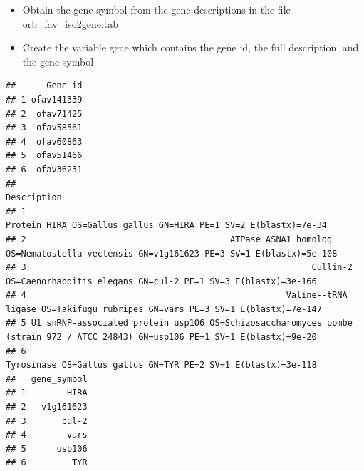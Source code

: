 \documentclass[
]{article}
\newenvironment{Shaded}{\begin{snugshade}}{\end{snugshade}}
\newcommand{\CharTok}[1]{\textcolor[rgb]{0.31,0.60,0.02}{#1}}
\newcommand{\DataTypeTok}[1]{\textcolor[rgb]{0.13,0.29,0.53}{#1}}
\newcommand{\KeywordTok}[1]{\textcolor[rgb]{0.13,0.29,0.53}{\textbf{#1}}}
\newcommand{\NormalTok}[1]{#1}
\newcommand{\OperatorTok}[1]{\textcolor[rgb]{0.81,0.36,0.00}{\textbf{#1}}}
\newcommand{\StringTok}[1]{\textcolor[rgb]{0.31,0.60,0.02}{#1}}
\providecommand{\tightlist}{%
  \setlength{\itemsep}{0pt}\setlength{\parskip}{0pt}}
\begin{document}
\begin{itemize}
\tightlist
\item
  Obtain the gene symbol from the gene descriptions in the file
  orb\_fav\_iso2gene.tab
\item
  Create the variable gene which contains the gene id, the full
  description, and the gene symbol
\end{itemize}

\begin{Shaded}
\end{Shaded}

\begin{verbatim}
##      Gene_id
## 1 ofav141339
## 2  ofav71425
## 3  ofav58561
## 4  ofav60863
## 5  ofav51466
## 6  ofav36231
##                                                                                                                     Description
## 1                                                               Protein HIRA OS=Gallus gallus GN=HIRA PE=1 SV=2 E(blastx)=7e-34
## 2                                        ATPase ASNA1 homolog OS=Nematostella vectensis GN=v1g161623 PE=3 SV=1 E(blastx)=5e-108
## 3                                                        Cullin-2 OS=Caenorhabditis elegans GN=cul-2 PE=1 SV=3 E(blastx)=3e-166
## 4                                                   Valine--tRNA ligase OS=Takifugu rubripes GN=vars PE=3 SV=1 E(blastx)=7e-147
## 5 U1 snRNP-associated protein usp106 OS=Schizosaccharomyces pombe (strain 972 / ATCC 24843) GN=usp106 PE=1 SV=1 E(blastx)=9e-20
## 6                                                                 Tyrosinase OS=Gallus gallus GN=TYR PE=2 SV=1 E(blastx)=3e-118
##   gene_symbol
## 1        HIRA
## 2   v1g161623
## 3       cul-2
## 4        vars
## 5      usp106
## 6         TYR
\end{verbatim}
\end{document}
